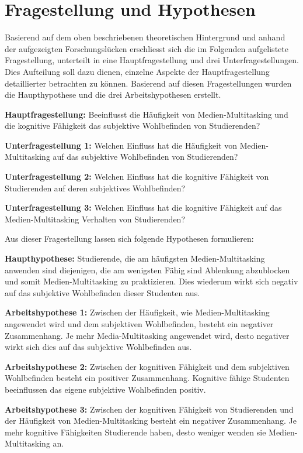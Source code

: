 \section{Fragestellung und Hypothesen}\label{section.fragestellung}
Basierend auf dem oben beschriebenen theoretischen Hintergrund und anhand der aufgezeigten Forschungslücken erschliesst sich die im Folgenden aufgelistete Fragestellung, unterteilt in eine Hauptfragestellung und drei Unterfragestellungen. Dies Aufteilung soll dazu dienen, einzelne Aspekte der Hauptfragestellung detaillierter betrachten zu können. Basierend auf diesen Fragestellungen wurden die Haupthypothese und die drei Arbeitshypothesen erstellt.  
\par
\textbf{Hauptfragestellung:} Beeinflusst die Häufigkeit von Medien-Multitasking und die kognitive Fähigkeit das subjektive Wohlbefinden von Studierenden?
\par
\textbf{Unterfragestellung 1:} Welchen Einfluss hat die Häufigkeit von Medien-Multitasking auf das subjektive Wohlbefinden von Studierenden?
\par
\textbf{Unterfragestellung 2:} Welchen Einfluss hat die kognitive Fähigkeit von Studierenden auf deren subjektives Wohlbefinden?
\par
\textbf{Unterfragestellung 3:} Welchen Einfluss hat die kognitive Fähigkeit auf das Medien-Multitasking Verhalten von Studierenden?
\par
Aus dieser Fragestellung lassen sich folgende Hypothesen formulieren:
\par
\textbf{Haupthypothese:}
Studierende, die am häufigsten Medien-Multitasking anwenden sind diejenigen, die am wenigsten Fähig sind Ablenkung abzublocken und somit Medien-Multitasking zu praktizieren. Dies wiederum wirkt sich negativ auf das subjektive Wohlbefinden dieser Studenten aus.
\par
\textbf{Arbeitshypothese 1:} Zwischen der Häufigkeit, wie Medien-Multitasking angewendet wird und dem subjektiven Wohlbefinden, besteht ein negativer Zusammenhang. Je mehr Media-Multitasking angewendet wird, desto negativer wirkt sich dies auf das subjektive Wohlbefinden aus.
\par
\textbf{Arbeitshypothese 2:} Zwischen der kognitiven Fähigkeit  und dem subjektiven Wohlbefinden besteht ein positiver Zusammenhang. Kognitive fähige Studenten beeinflussen das eigene subjektive Wohlbefinden positiv.
\par
\textbf{Arbeitshypothese 3:} Zwischen der kognitiven Fähigkeit von Studierenden und der Häufigkeit von Medien-Multitasking besteht ein negativer Zusammenhang. Je mehr kognitive Fähigkeiten Studierende haben, desto weniger wenden sie Medien-Multitasking an.
